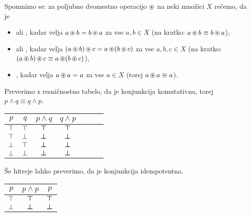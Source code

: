                 Spomnimo se: za poljubno dvomestno operacijo $\mathop{\circledast}$ na neki množici $X$ rečemo, da je
                \begin{itemize}
                        \item
                                 ali , kadar velja $a \mathop{\circledast} b = b \mathop{\circledast} a$ za vse $a, b \in X$ (na kratko: $a \mathop{\circledast} b \equiv b \mathop{\circledast} a$),
                        \item
                                  ali , kadar velja $(a \mathop{\circledast} b) \mathop{\circledast} c = a \mathop{\circledast} (b \mathop{\circledast} c)$ za vse $a, b, c \in X$ (na kratko: $(a \mathop{\circledast} b) \mathop{\circledast} c \equiv a \mathop{\circledast} (b \mathop{\circledast} c)$),
                        \item
                                 , kadar velja $a \mathop{\circledast} a = a$ za vse $a \in X$ (torej $a \mathop{\circledast} a \equiv a$).
                \end{itemize}

                Preverimo z resničnostno tabelo, da je konjunkcija komutativna, torej $p \land q \equiv q \land p$.

                \begin{center}
                        \begin{tabular}{cc|ccccc}
                                $p$ & $q$ & $p \land q$ & $q \land p$ \\
                                \hline
                                $\top$ & $\top$ & $\bm{\top}$ & $\bm{\top}$ \\
                                $\top$ & $\bot$ & $\bm{\bot}$ & $\bm{\bot}$ \\
                                $\bot$ & $\top$ & $\bm{\bot}$ & $\bm{\bot}$ \\
                                $\bot$ & $\bot$ & $\bm{\bot}$ & $\bm{\bot}$
                        \end{tabular}
                \end{center}

                Še hitreje lahko preverimo, da je konjunkcija idempotentna.

                \begin{center}
                        \begin{tabular}{c|cc}
                                $p$ & $p \land p$ & $p$ \\
                                \hline
                                $\top$ & $\bm{\top}$ & $\bm{\top}$ \\
                                $\bot$ & $\bm{\bot}$ & $\bm{\bot}$
                        \end{tabular}
                \end{center}

